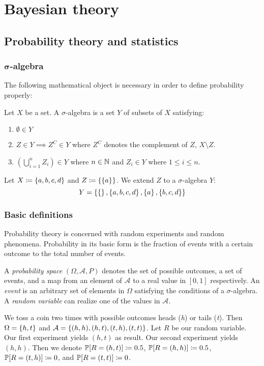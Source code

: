 \chapter{Bayesian theory}
\section{Probability theory and statistics}
\subsection{$\boldsymbol\sigma$-algebra}
%
The following mathematical object is necessary in order to define probability properly:

\begin{definition}
  Let $X$ be a set. A $\sigma$-algebra is a set $Y$ of subsets of $X$ satisfying:
  \begin{enumerate}
    \item $\emptyset \in Y$
    \item $Z \in Y \implies Z^C \in Y$ where $Z^C$ denotes the complement of $Z$, $X \setminus Z$.
    \item $\left(\bigcup_{i=1}^n Z_i\right) \in Y$ where $n \in \mathbb N$ and $Z_i \in Y$ where $1 \leq i \leq n$.
  \end{enumerate}
\end{definition}
\begin{example}
  Let $X \coloneqq \left\{a, b, c, d\right\}$ and $Z \coloneqq \left\{\left\{a\right\}\right\}$. We extend $Z$ to a $\sigma$-algebra $Y$:
  \[ Y = \left\{\left\{\right\}, \left\{a,b,c,d\right\}, \left\{a\right\}, \left\{b,c,d\right\}\right\} \]
\end{example}

\subsection{Basic definitions}
\label{sec:bp-def}
%
Probability theory is concerned with random experiments and random phenomena. Probability in its basic form is the fraction of events with a certain outcome to the total number of events.
%
\begin{definition}
  A \emph{probability space} $(\Omega, \mathcal A, P)$ denotes
    the set of possible outcomes, a set of events, and a map from an element of $\mathcal A$ to a real value in $[0,1]$ respectively.
  An \emph{event} is an arbitrary set of elements in $\Omega$ satisfying the conditions of a $\sigma$-algebra.
  A \emph{random variable} can realize one of the values in $\mathcal A$.
\end{definition}
\begin{example}
  We toss a coin two times with possible outcomes heads (\textit h) or tails (\textit t). Then $\Omega = \left\{h,t\right\}$ and $\mathcal A = \left\{(h, h), (h, t), (t, h), (t, t)\right\}$.
  Let $R$ be our random variable. Our first experiment yields $(h, t)$ as result. Our second experiment yields $(h, h)$.
  Then we denote $\mathbb P[R=(h,t)] \coloneqq 0.5$, $\mathbb P[R=(h,h)] \coloneqq 0.5$, $\mathbb P[R=(t,h)] \coloneqq 0$, and $\mathbb P[R=(t,t)] \coloneqq 0$.
\end{example}


